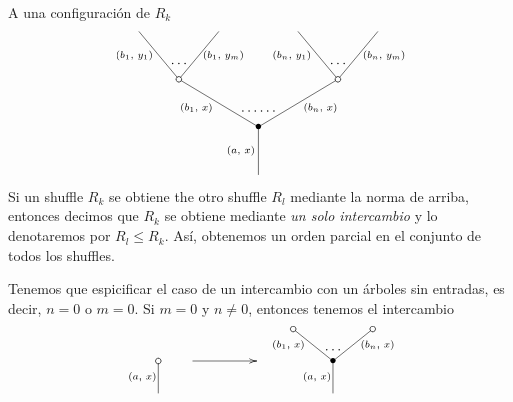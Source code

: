 \documentclass[../main.tex]{subfiles}
\begin{document}
A una configuraci\'on de $R_k$
\begin{equation}
    \xy
    <0.08cm, 0cm>:
    (0.0, 0.0)*{}="1"; %
    (0.0, 15.0)*=0{\bullet}="2"; %
    (-25.0, 30.0)*\cir<2pt>{}="3"; %
    (-37.5, 45.0)*{}="4"; %
    (-12.5, 45.0)*{}="5"; %
    (25.0, 30.0)*\cir<2pt>{}="6"; %
    (12.5, 45.0)*{}="7"; %
    (37.5, 45.0)*{}="8"; %
    "1";"2" **\dir{-};
    "2";"3" **\dir{-};
    "3";"4" **\dir{-};
    "3";"5" **\dir{-};
    "2";"6" **\dir{-};
    "6";"7" **\dir{-};
    "6";"8" **\dir{-};
    (-5.5, 7.5)*=0{\scriptstyle (a,\text{ }x)};
    (-19.5, 21)*=0{\scriptstyle (b_1,\text{ }x)};
    (-39, 37.5)*=0{\scriptstyle (b_1,\text{ }y_1)};
    (-11, 37.5)*=0{\scriptstyle (b_1,\text{ }y_m)};
    (19.5, 21)*=0{\scriptstyle (b_n,\text{ }x)};
    (10.5, 37.5)*=0{\scriptstyle (b_n,\text{ }y_1)};
    (39.5, 37.5)*=0{\scriptstyle (b_n,\text{ }y_m)};
    (-25,35)*{\dots};
    (25,35)*{\dots};
    (0,20)*{\dots\dots};
    \endxy
\end{equation}
Si un shuffle $R_k$ se obtiene the otro shuffle $R_l$ mediante la norma de arriba, entonces decimos que $R_k$ se obtiene mediante \emph{un solo intercambio} y lo denotaremos por $R_l\le R_k$.
As\'i, obtenemos un orden parcial en el conjunto de todos los shuffles.

Tenemos que espicificar el caso de un intercambio con un \'arboles sin entradas, es decir, $n=0$ o $m=0$. Si $m=0$ y $n\ne 0$, entonces tenemos el intercambio
\begin{equation}
    \xy
    <0.08cm, 0cm>:
    (0.0, 0.0)*{}="1"; %
    (0.0, 10.0)*\cir<2pt>{}="2"; %
    "1";"2" **\dir{-};
    (-5.0, 5.0)*=0{\scriptstyle (a,\text{ }x)};
    \endxy
    \xy
    <0.08cm, 0cm>:
    (-20, 0.0)*{}="1";
    (20, 10.0)*{}="2";
    {\ar(-10, 10)*{};(10,10)*{}};
    \endxy
    \xy
    <0.08cm, 0cm>:
    (0.0, 0.0)*{}="1"; %
    (0.0, 10.0)*=0{\bullet}="2"; %
    (-12.5, 20.0)*\cir<2pt>{}="3"; %
    (12.5, 20.0)*\cir<2pt>{}="4"; %
    "1";"2" **\dir{-};
    "2";"3" **\dir{-};
    "2";"4" **\dir{-};
    (-5.0, 5.0)*=0{\scriptstyle (a,\text{ }x)};
    (-14, 15.0)*=0{\scriptstyle (b_1,\text{ }x)};
    (14, 15.0)*=0{\scriptstyle (b_n,\text{ }x)};
    (0,13.5)*{\dots};
    \endxy
\end{equation}
\end{document}
